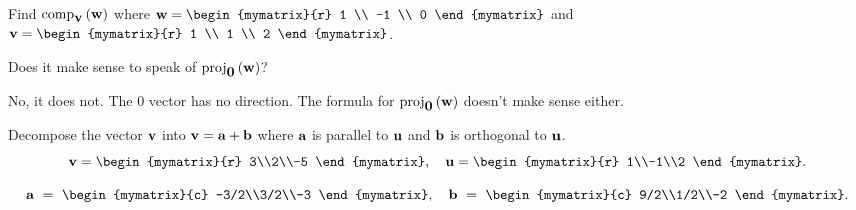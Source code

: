 \begin{enumialphparenastyle}
\begin{ex} Find $\mbox{\rm comp}_{\mbox{\bf v}}\left(\mbox{\bf w}\right) $ where 
  $\vect{w}=\begin{mymatrix}{r}
    1 \\
    -1 \\
    0
  \end{mymatrix} $ and $\vect{v}=\begin{mymatrix}{r}
    1 \\
    1 \\
    2
  \end{mymatrix}$.
\end{ex}


\begin{ex}
  Does it make sense to speak of $\mbox{\rm proj}_{\mbox{\bf 0}}\left(\mbox{\bf w}\right)$?
  \begin{sol}
    No, it does not. The $0$ vector has no direction. The formula for
    $\mbox{\rm proj}_{\mbox{\bf 0}}\left(\mbox{\bf w}\right)$ doesn't make sense either.
  \end{sol}
\end{ex}

\begin{ex}
  Decompose the vector $\mbox{\bf v}$ into $\mbox{\bf v}=\mbox{\bf a}+\mbox{\bf b}$
  where $\mbox{\bf a}$ is parallel to $\mbox{\bf u}$ and $\mbox{\bf b}$ is
  orthogonal to $\mbox{\bf u}$.
  \begin{equation*}
    \vect{v} = \begin{mymatrix}{r} 3\\2\\-5 \end{mymatrix},\quad
    \vect{u} = \begin{mymatrix}{r} 1\\-1\\2 \end{mymatrix}.
  \end{equation*}
  
  \begin{sol}
    \begin{equation*}
      \vect{a} ~=~ \begin{mymatrix}{c} -3/2\\3/2\\-3 \end{mymatrix},\quad
      \vect{b} ~=~ \begin{mymatrix}{c} 9/2\\1/2\\-2 \end{mymatrix}.
    \end{equation*}
  \end{sol}
\end{ex}


\end{enumialphparenastyle}
